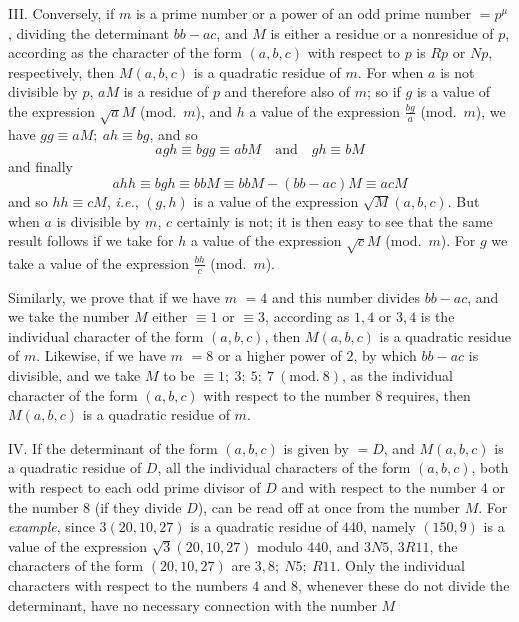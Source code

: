 III. Conversely, if $m$ is a prime number or a power of an odd prime number $=p^\mu$, dividing the determinant $bb-ac$, and $M$ is either a residue or a nonresidue of $p$, according as the character of the form $(a,b,c)$ with respect to $p$ is $Rp$ or $Np$, respectively, then $M(a,b,c)$ is a quadratic residue of $m$. For when $a$ is not divisible by $p$, $aM$ is a residue of $p$ and therefore also of $m$; so if $g$ is a value of the expression $\surd aM$ (mod.\ $m$), and $h$ a value of the expression $\frac{bg}{a}$ (mod.\ $m$), we have $gg\equiv aM;\ ah\equiv bg$, and so
\[
agh\equiv bgg\equiv abM\quad\text{and}\quad gh\equiv bM
\]
and finally
\[
ahh\equiv bgh\equiv bbM\equiv bbM-(bb-ac)M\equiv acM
\]
and so $hh\equiv cM$, \textit{i.e.}, $(g,h)$ is a value of the expression $\surd M(a,b,c)$. But when $a$ is divisible by $m$, $c$ certainly is not; it is then easy to see that the same result follows if we take for $h$ a value of the expression $\surd cM$ (mod.\ $m$). For $g$ we take a value of the expression $\frac{bh}{c}$ (mod.\ $m$).

Similarly, we prove that if we have $m$ $=4$ and this number divides $bb-ac$, and we take the number $M$ either $\equiv1$ or $\equiv3$, according as $1,4$ or $3,4$ is the individual character
of the form $(a,b,c)$, then $M(a,b,c)$ is a quadratic residue of $m$. Likewise, if we have $m$ $=8$ or a higher power of $2$, by which $bb-ac$ is divisible, and we take $M$ to be $\equiv1;\ 3;\ 5;\ 7\ (\mathrm{mod.}\ 8)$, as the individual character of the form $(a,b,c)$ with respect to the number $8$ requires, then $M(a,b,c)$ is a quadratic residue of $m$.

IV. If the determinant of the form $(a,b,c)$ is given by $=D$, and $M(a,b,c)$ is a quadratic residue of $D$, all the individual characters of the form $(a,b,c)$, both with respect to each odd prime divisor of $D$ and with respect to the number $4$ or the number $8$ (if they divide $D$), can be read off at once from the number $M$. For \textit{example}, since $3(20,10,27)$ is a quadratic residue of $440$, namely $(150,9)$ is a value of the expression $\surd3(20,10,27)$ modulo $440$, and $3N5$, $3R11$, the characters of the form $(20,10,27)$ are $3,8;\ N5;\ R11$. Only the individual characters with respect to the numbers $4$ and $8$, whenever these do not divide the determinant, have no necessary connection with the number $M$

